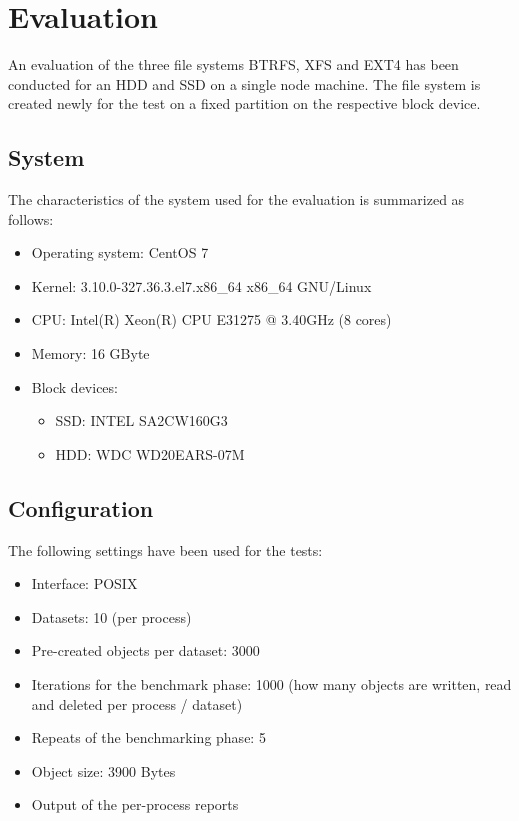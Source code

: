 \documentclass[a4paper,10pt]{article}
\begin{document}
\section{Evaluation}
An evaluation of the three file systems BTRFS, XFS and EXT4 has been conducted for an HDD and SSD on a single node machine.
The file system is created newly for the test on a fixed partition on the respective block device.

\subsection{System}

The characteristics of the system used for the evaluation is summarized as follows:
\begin{itemize}
\item Operating system: CentOS 7
\item Kernel: 3.10.0-327.36.3.el7.x86\_64 x86\_64 GNU/Linux
\item CPU: Intel(R) Xeon(R) CPU E31275 @ 3.40GHz (8 cores)
\item Memory: 16 GByte
\item Block devices: 
  \begin{itemize}
  \item SSD: INTEL SA2CW160G3
  \item HDD: WDC WD20EARS-07M
  \end{itemize}
\end{itemize}


\subsection{Configuration}

The following settings have been used for the tests:
\begin{itemize}
\item Interface: POSIX
\item Datasets: 10 (per process)
\item Pre-created objects per dataset: 3000 
\item Iterations for the benchmark phase: 1000 (how many objects are written, read and deleted per process / dataset)
\item Repeats of the benchmarking phase: 5
\item Object size: 3900 Bytes
\item Output of the per-process reports
\end{itemize}
\end{document}
